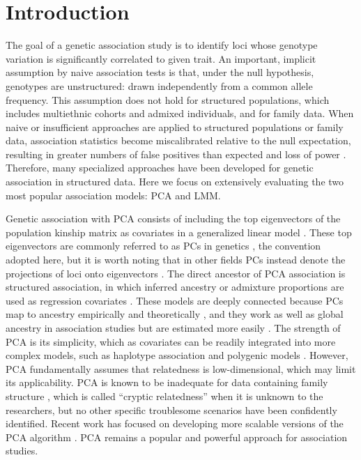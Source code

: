 \documentclass[11pt]{article}
\begin{document}
\section{Introduction} 

The goal of a genetic association study is to identify loci whose genotype variation is significantly correlated to given trait.
An important, implicit assumption by naive association tests is that, under the null hypothesis, genotypes are unstructured: drawn independently from a common allele frequency.
This assumption does not hold for structured populations, which includes multiethnic cohorts and admixed individuals, and for family data.
When naive or insufficient approaches are applied to structured populations or family data, association statistics become miscalibrated relative to the null expectation, resulting in greater numbers of false positives than expected and loss of power \citep{devlin_genomic_1999, voight_confounding_2005, astle_population_2009}.
Therefore, many specialized approaches have been developed for genetic association in structured data.
Here we focus on extensively evaluating the two most popular association models: PCA and LMM.

Genetic association with PCA consists of including the top eigenvectors of the population kinship matrix as covariates in a generalized linear model \citep{zhang_semiparametric_2003, price_principal_2006, bouaziz_accounting_2011}.
These top eigenvectors are commonly referred to as PCs in genetics \citep{patterson_population_2006}, the convention adopted here, but it is worth noting that in other fields PCs instead denote the projections of loci onto eigenvectors \citep{jolliffe_principal_2002}.
The direct ancestor of PCA association is structured association, in which inferred ancestry or admixture proportions are used as regression covariates \citep{pritchard_association_2000}.
These models are deeply connected because PCs map to ancestry empirically \citep{alexander_fast_2009, zhou_strong_2016} and theoretically \citep{mcvean_genealogical_2009,zheng_eigenanalysis_2016,cabreros_likelihood-free_2019,chiu_inferring_2022}, and they work as well as global ancestry in association studies but are estimated more easily \citep{patterson_population_2006, zhao_arabidopsis_2007, alexander_fast_2009, bouaziz_accounting_2011}.
The strength of PCA is its simplicity, which as covariates can be readily integrated into more complex models, such as haplotype association \citep{xu_detecting_2014} and polygenic models \citep{qian_fast_2020}.
However, PCA fundamentally assumes that relatedness is low-dimensional, which may limit its applicability.
PCA is known to be inadequate for data containing family structure \citep{patterson_population_2006, thornton_roadtrips:_2010, price_new_2010}, which is called ``cryptic relatedness'' when it is unknown to the researchers, but no other specific troublesome scenarios have been confidently identified.
Recent work has focused on developing more scalable versions of the PCA algorithm \citep{lee_sparse_2012, abraham_fast_2014, galinsky_fast_2016, abraham_flashpca2:_2017, agrawal_scalable_2020}.
PCA remains a popular and powerful approach for association studies.
\end{document}
